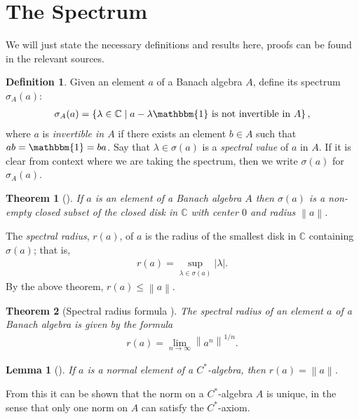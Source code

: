\documentclass[11pt,a4paper]{report}
\theoremstyle{plain}
\newtheorem*{thm*}{Theorem}
\newtheorem{lemma}{Lemma}
\theoremstyle{definition}
\newtheorem{defn}{Definition}
\newcommand{\1}{\mathbbm{1}}
\newcommand{\C}{\mathbb{C}}
\newcommand{\spec}[1]{\sigma(#1)}
\begin{document}
\section{The Spectrum}
We will just state the necessary definitions and results here, proofs can be 
found in the relevant sources.

\begin{defn}
	Given an element $a$ of a Banach algebra $A$, define its spectrum $\sigma_A(a)$:
	\begin{align*}
		\sigma_A(a)=\left\{\lambda\in \C \mid a-\lambda\1 
								\mbox{ is not invertible in }A\right\},
	\end{align*}
	where $a$ is \emph{invertible in $A$} if there exists an element $b\in A$ such 
	that $ab=\1=ba$. Say that $\lambda\in\spec a$ is a \emph{spectral value} of $a$ 
	in $A$. If it is clear from context where we are taking the spectrum, then we 
	write $\spec{a}$ for $\sigma_A(a)$. 
\end{defn}

\begin{thm*}[{\cite[3.2.3]{kadison83}}]
	If $a$ is an element of a Banach algebra $A$ then $\spec a$ is a non-empty 
	closed subset of the closed disk in $\C$ with center $0$ and radius 
	$\left\|a\right\|$.
\end{thm*}

The \emph{spectral radius}, $r(a)$, of $a$ is the radius of the smallest disk in 
$\C$ containing $\spec a$; that is, 
\begin{align*}
	r(a)=\sup_{\lambda\in\spec a}{|\lambda|}.
\end{align*}
By the above theorem, $r(a)\leq\left\|a\right\|$. 

\begin{thm*}[Spectral radius formula {\cite[3.3.3]{kadison83}}]
	The spectral radius of an element $a$ of a Banach algebra is given by the formula
	\begin{align*}
		r(a)= \lim_{n\to\infty} \left\|a^n\right\|^{1/n}.
	\end{align*}
\end{thm*}

\begin{lemma}[{\cite[4.1.1(i)]{kadison83}}]\label{lemma:411}
	If $a$ is a normal element of a $C^\ast$-algebra, then $r(a)=\left\|a\right\|$.
\end{lemma}

From this it can be shown that the norm on a $C^\ast$-algebra $A$ is unique, in 
the sense that only one norm on $A$ can satisfy the $C^\ast$-axiom. 
\cite[II.1.6.5]{blackadar06}
\end{document}
